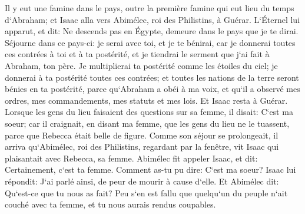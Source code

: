 \verse Il y eut une famine dans le pays, outre la première famine qui eut lieu du temps d`Abraham; et Isaac alla vers Abimélec, roi des Philistins, à Guérar. 
\verse L`Éternel lui apparut, et dit: Ne descends pas en Égypte, demeure dans le pays que je te dirai. 
\verse Séjourne dans ce pays-ci: je serai avec toi, et je te bénirai, car je donnerai toutes ces contrées à toi et à ta postérité, et je tiendrai le serment que j`ai fait à Abraham, ton père. 
\verse Je multiplierai ta postérité comme les étoiles du ciel; je donnerai à ta postérité toutes ces contrées; et toutes les nations de la terre seront bénies en ta postérité, 
\verse parce qu`Abraham a obéi à ma voix, et qu`il a observé mes ordres, mes commandements, mes statuts et mes lois. 
\verse Et Isaac resta à Guérar. 
\verse Lorsque les gens du lieu faisaient des questions sur sa femme, il disait: C`est ma soeur; car il craignait, en disant ma femme, que les gens du lieu ne le tuassent, parce que Rebecca était belle de figure. 
\verse Comme son séjour se prolongeait, il arriva qu`Abimélec, roi des Philistins, regardant par la fenêtre, vit Isaac qui plaisantait avec Rebecca, sa femme. 
\verse Abimélec fit appeler Isaac, et dit: Certainement, c`est ta femme. Comment as-tu pu dire: C`est ma soeur? Isaac lui répondit: J`ai parlé ainsi, de peur de mourir à cause d`elle. 
\verse Et Abimélec dit: Qu`est-ce que tu nous as fait? Peu s`en est fallu que quelqu`un du peuple n`ait couché avec ta femme, et tu nous aurais rendus coupables. 
